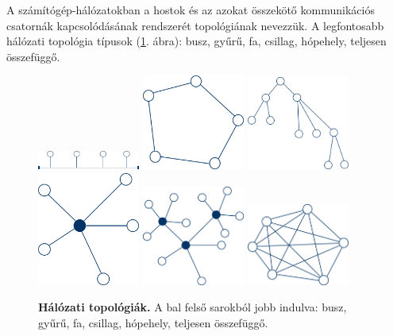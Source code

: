 \documentclass[12pt]{article}
\theoremstyle{plain}
\begin{document}
A számítógép-hálózatokban a hostok és az azokat összekötő kommunikációs csatornák kapcsolódásának rendszerét topológiának nevezzük.  A legfontosabb hálózati topológia típusok (\ref{fig:top}. ábra): busz, gyűrű, fa, csillag, hópehely, teljesen összefüggő.

\begin{figure}[H]
\centering
    \includegraphics[width=0.3\textwidth]{media/bus.png}
    \hspace{0.75cm}
    \includegraphics[width=0.3\textwidth]{media/gyuru.png}
    \vspace{1.5cm}
    \includegraphics[width=0.3\textwidth]{media/fa.png}
    \hspace{1cm}
    \includegraphics[width=0.3\textwidth]{media/csillag.png}
    \vspace{1.5cm}
    \includegraphics[width=0.3\textwidth]{media/hop.png}
     \hspace{1cm}
    \includegraphics[width=0.3\textwidth]{media/telj.png}    
    \caption{\textbf{Hálózati topológiák.} A bal felső sarokból jobb indulva: busz, gyűrű, fa, csillag, hópehely, teljesen összefüggő.} 
    \label{fig:top}


\end{figure}
\end{document}
